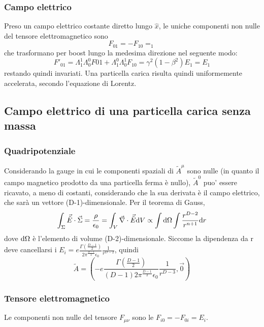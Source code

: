 \subsubsection{Campo elettrico}
Preso un campo elettrico costante diretto lungo $\hat{x}$, le uniche componenti non nulle del tensore elettromagnetico sono
\[ F_{01} = - F_{10} = _1 \]
che trasformano per boost lungo la medesima direzione nel seguente modo:
\[ F'_{01} = \Lambda^1_1\Lambda^0_0 F{01} + \Lambda^0_1\Lambda^1_0 F_{10} = \gamma^2(1-\beta^2)E_1 = E_1 \]
restando quindi invariati.
Una particella carica risulta quindi uniformemente accelerata, secondo l'equazione di Lorentz.






\subsection{ Campo elettrico di una particella carica senza massa}
\subsubsection{Quadripotenziale}
Considerando la gauge in cui le componenti spaziali di $\tilde{A}^\mu$ sono nulle (in quanto il campo magnetico prodotto da una particella ferma \`e nullo), $\tilde{A}^0$ puo' essere ricavato, a meno di costanti, considerando che la sua derivata \`e il campo elettrico, che sar\`a un vettore (D-1)-dimensionale. Per il teorema di Gauss,
\[ \int_\Sigma \vec{\tilde{E}}\cdot\vec{\Sigma} = \frac{\rho}{\epsilon_0} = \int_V \vec{\nabla}\cdot\vec{\tilde{E}} \mathrm{d} V \propto \int\mathrm{d}\Omega \int \frac{r^{D-2}}{r^{n+1}} \mathrm{d} r \]
dove $\mathrm{d}\Omega$ \`e l'elemento di volume (D-2)-dimensionale. Siccome la dipendenza da r deve cancellarsi i
\( E_i = e\frac{\Gamma(\frac{D-1}{2})}{2\pi^{\frac{D-1}{2}}\epsilon_0} \frac{1}{r^{D-2}} \), quindi
\[ \tilde{A} = (-e\frac{\Gamma(\frac{D-1}{2})}{(D-1)2\pi^{\frac{D-1}{2}}\epsilon_0} \frac{1}{r^{D-3}},\vec{0}) \]
\subsubsection{Tensore elettromagnetico}
Le componenti non nulle del tensore $F_{\mu\nu}$ sono le $F_{i0}=-F_{0i}=E_i$.


